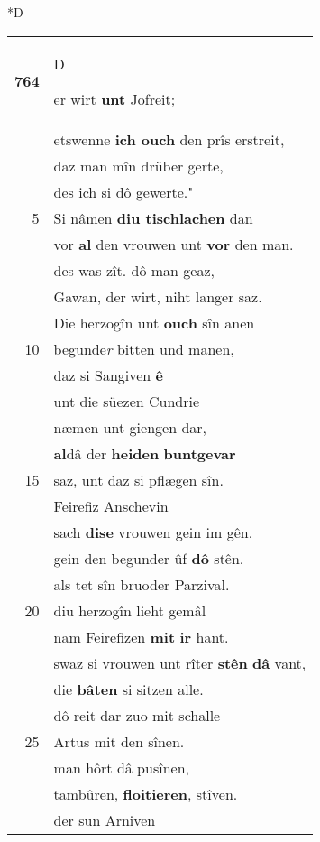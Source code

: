 \documentclass[8pt,a4paper,notitlepage]{article}
\begin{document}
\begin{table}[ht]
\begin{minipage}[t]{0.5\linewidth}
\small
\begin{center}*D
\end{center}
\begin{tabular}{rl}
\textbf{764} & \begin{large}D\end{large}er wirt \textbf{unt} Jofreit;\\ 
 & etswenne \textbf{ich ouch} den prîs erstreit,\\ 
 & daz man mîn drüber gerte,\\ 
 & des ich si dô gewerte."\\ 
5 & Si nâmen \textbf{diu tischlachen} dan\\ 
 & vor \textbf{al} den vrouwen unt \textbf{vor} den man.\\ 
 & des was zît. dô man geaz,\\ 
 & Gawan, der wirt, niht langer saz.\\ 
 & Die herzogîn unt \textbf{ouch} sîn anen\\ 
10 & begunde\textit{r} bitten und manen,\\ 
 & daz si Sangiven \textbf{ê}\\ 
 & unt die süezen Cundrie\\ 
 & næmen unt giengen dar,\\ 
 & \textbf{al}dâ der \textbf{heiden} \textbf{buntgevar}\\ 
15 & saz, unt daz si pflægen sîn.\\ 
 & Feirefiz Anschevin\\ 
 & sach \textbf{dise} vrouwen gein im gên.\\ 
 & gein den begunder ûf \textbf{dô} stên.\\ 
 & als tet sîn bruoder Parzival.\\ 
20 & diu herzogîn lieht gemâl\\ 
 & nam Feirefizen \textbf{mit} \textbf{ir} hant.\\ 
 & swaz si vrouwen unt rîter \textbf{stên} \textbf{dâ} vant,\\ 
 & die \textbf{bâten} si sitzen alle.\\ 
 & dô reit dar zuo mit schalle\\ 
25 & Artus mit den sînen.\\ 
 & man hôrt dâ pusînen,\\ 
 & tambûren, \textbf{floitieren}, stîven.\\ 
 & der sun Arniven\\ 

\end{tabular}
\end{minipage}
\end{table}
\end{document}
